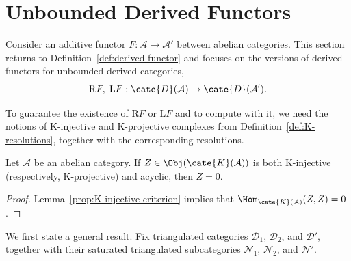 
\section{Unbounded Derived Functors}\label{sec:unbounded-derived}
\hypertarget{o014.aljabr2.chapter4.unbounded-derived-functors}{ }

Consider an additive functor $F:\mathcal{A}\to\mathcal{A}'$ between abelian
categories. This section returns to Definition~\ref{def:derived-functor} and
focuses on the versions of derived functors for unbounded derived categories,
\[ \mathrm{R}F, \; \mathrm{L}F: \cate{D}(\mathcal{A}) \to \cate{D}(\mathcal{A}'). \]

To guarantee the existence of $\mathrm{R}F$ or $\mathrm{L}F$ and to compute
with it, we need the notions of K-injective and K-projective complexes from
Definition~\ref{def:K-resolutions}, together with the corresponding
resolutions.

\begin{lemma}\label{prop:K-injective-zero}
	Let $\mathcal{A}$ be an abelian category. If
	$Z\in\Obj(\cate{K}(\mathcal{A}))$ is both K-injective (respectively,
	K-projective) and acyclic, then $Z=0$.
\end{lemma}
\begin{proof}
	Lemma~\ref{prop:K-injective-criterion} implies that
	$\Hom_{\cate{K}(\mathcal{A})}(Z,Z)=0$.
\end{proof}

We first state a general result. Fix triangulated categories
$\mathcal{D}_1$, $\mathcal{D}_2$, and $\mathcal{D}'$, together with their
saturated triangulated subcategories $\mathcal{N}_1$, $\mathcal{N}_2$, and
$\mathcal{N}'$.

